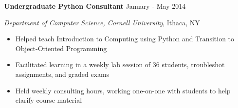 
\vspace{5pt}

\textbf{Undergraduate Python Consultant} \hfill January - May 2014

\textit{Department of Computer Science, Cornell University}, Ithaca, NY

\begin{itemize}
    \item Helped teach Introduction to Computing using Python and Transition to Object-Oriented Programming
    \item Facilitated learning in a weekly lab session of 36 students, troubleshot assignments, and graded exams
    \item Held weekly consulting hours, working one-on-one with students to help clarify course material
\end{itemize}
